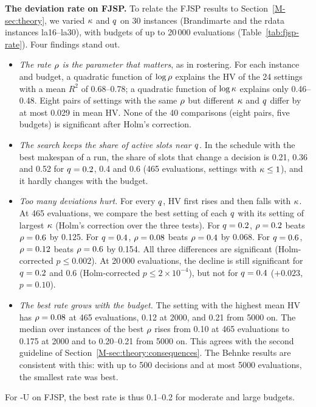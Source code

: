 \documentclass[journal]{IEEEtran}
\begin{document}
\textbf{The deviation rate on FJSP.}
To relate the FJSP results to Section~\ref{M-sec:theory}, we varied $\kappa$ and $q$ on 30 instances
(Brandimarte and the rdata instances la16--la30), with budgets of up to 20\,000 evaluations (Table~\ref{tab:fjsp-rate}).
Four findings stand out.
\begin{itemize}
  \item \emph{The rate $\rho$ is the parameter that matters}, as in rostering.
  For each instance and budget, a quadratic function of $\log\rho$ explains the HV of the 24 settings with a mean $R^2$ of 0.68--0.78; a quadratic function of $\log\kappa$ explains only 0.46--0.48.
  Eight pairs of settings with the same $\rho$ but different $\kappa$ and $q$ differ by at most 0.029 in mean HV.
  None of the 40 comparisons (eight pairs, five budgets) is significant after Holm's correction.
  \item \emph{The search keeps the share of active slots near $q$.}
  In the schedule with the best makespan of a run, the share of slots that change a decision is 0.21, 0.36 and 0.52 for $q = 0.2$, 0.4 and 0.6 (465 evaluations, settings with $\kappa \le 1$), and it hardly changes with the budget.
  \item \emph{Too many deviations hurt.}
  For every $q$, HV first rises and then falls with $\kappa$.
  At 465 evaluations, we compare the best setting of each $q$ with its setting of largest $\kappa$ (Holm's correction over the three tests).
  For $q = 0.2$, $\rho = 0.2$ beats $\rho = 0.6$ by 0.125.
  For $q = 0.4$, $\rho = 0.08$ beats $\rho = 0.4$ by 0.068.
  For $q = 0.6$, $\rho = 0.12$ beats $\rho = 0.6$ by 0.154.
  All three differences are significant (Holm-corrected $p \le 0.002$).
  At 20\,000 evaluations, the decline is still significant for $q = 0.2$ and 0.6 (Holm-corrected $p \le 2 \times 10^{-4}$), but not for $q = 0.4$ ($+0.023$, $p = 0.10$).
  \item \emph{The best rate grows with the budget.}
  The setting with the highest mean HV has $\rho = 0.08$ at 465 evaluations, 0.12 at 2000, and 0.21 from 5000 on.
  The median over instances of the best $\rho$ rises from 0.10 at 465 evaluations to 0.175 at 2000 and to 0.20--0.21 from 5000 on.
  This agrees with the second guideline of Section~\ref{M-sec:theory:consequences}.
  The Behnke results are consistent with this: with up to 500 decisions and at most 5000 evaluations, the smallest rate was best.
\end{itemize}
For \RDD-U on FJSP, the best rate is thus 0.1--0.2 for moderate and large budgets.





\end{document}
